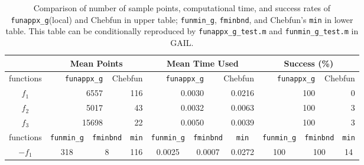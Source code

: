 \documentclass[review]{elsarticle}
\theoremstyle{definition}
\newcommand{\funappxg}{\texttt{funappx\_g}\xspace}
\newcommand{\funappxglobalg}{\texttt{funappxglobal\_g}\xspace}
\newcommand{\funming}{\texttt{funmin\_g}\xspace}
\newcommand{\fminbnd}{\texttt{fminbnd}\xspace}
\begin{document}
%
\begin{table}[bt]
	\centering
	\caption{Comparison of number of sample points, computational time,  and success
		rates of \funappxg (local) %
		and Chebfun in upper table;
		\funming, \fminbnd, and Chebfun's \texttt{min} in lower table.
		This table can be conditionally reproduced by
		\texttt{funappx\_g\_test.m} and \texttt{funmin\_g\_test.m}  in GAIL.}
	\label{tab:localVsGlobalVsChebfun}
	{\footnotesize
		\setlength{\tabcolsep}{0.38em} %
		\begin{tabular}{crrrrrrrrrrrrrrrrrr}	
			\hline	
			&    \multicolumn{6}{c}{\bf Mean Points}   & \multicolumn{6}{c}{\bf Mean Time
				Used}  & \multicolumn{6}{c}{\bf Success (\%)}
			\\ \hline  functions &  \multicolumn{3}{r}{\funappxg}  &    
			\multicolumn{3}{r}{Chebfun}
			&   \multicolumn{3}{r}{\funappxg}   &  \multicolumn{3}{r}{Chebfun} &
			\multicolumn{3}{r}{\funappxg}  &   \multicolumn{3}{r}{Chebfun}
			\\ \toprule
			$f_1$   &   \multicolumn{3}{r}{6557}       &   \multicolumn{3}{r}{116}       &
			\multicolumn{3}{r}{0.0030}       &   \multicolumn{3}{r}{0.0216}       &
			\multicolumn{3}{r}{100}       &   \multicolumn{3}{r}{0}
			\\        $f_2$   & \multicolumn{3}{r}{5017}       &   \multicolumn{3}{r}{43}       &
			\multicolumn{3}{r}{0.0032 }       &   \multicolumn{3}{r}{0.0063}       &
			\multicolumn{3}{r}{100}       &   \multicolumn{3}{r}{3}
			\\        $f_3$   & \multicolumn{3}{r}{15698}       &   \multicolumn{3}{r}{22}       &
			\multicolumn{3}{r}{0.0050}       &   \multicolumn{3}{r}{0.0039}       &
			\multicolumn{3}{r}{100}       &   \multicolumn{3}{r}{3 }	
			\\ \hline
			functions &  \multicolumn{2}{c}{\funming} &  \multicolumn{2}{c}{\fminbnd}  &
			\multicolumn{2}{c}{\texttt{min}}
			&  \multicolumn{2}{c}{\funming}  &  \multicolumn{2}{c}{\fminbnd }  &
			\multicolumn{2}{c}{\texttt{min} }  &  \multicolumn{2}{c}{\funming} &
			\multicolumn{2}{c}{\fminbnd} & \multicolumn{2}{c}{\texttt{min}}
			\\ \toprule
			$-f_1$   &  \multicolumn{2}{c}{318} &  \multicolumn{2}{c}{8} &
			\multicolumn{2}{c}{116} &  \multicolumn{2}{c}{0.0025} &
			\multicolumn{2}{c}{0.0007} &  \multicolumn{2}{c}{0.0272} &
			\multicolumn{2}{c}{100} &  \multicolumn{2}{c}{100 } &  \multicolumn{2}{c}{14}

\end{tabular}}
\end{table}
\end{document}

